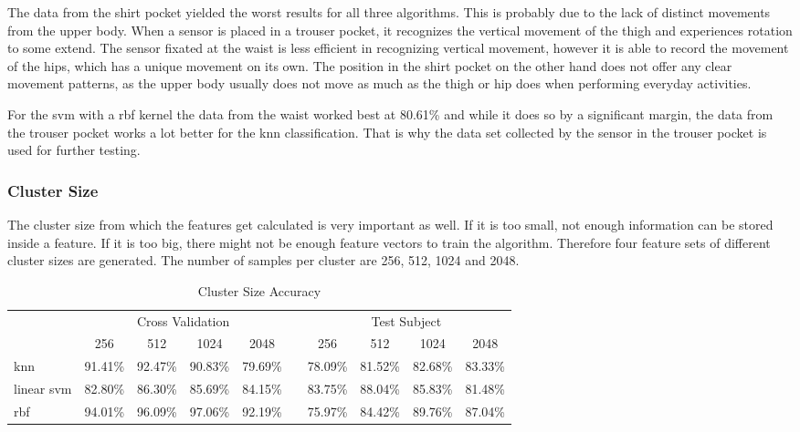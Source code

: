 The data from the shirt pocket yielded the worst results for all three algorithms. This is probably due to the lack of distinct movements from the upper body. When a sensor is placed in a trouser pocket, it recognizes the vertical movement of the thigh and experiences rotation to some extend.
The sensor fixated at the waist is less efficient in recognizing vertical movement, however it is able to record the movement of the hips, which has a unique movement on its own. The position in the shirt pocket on the other hand does not offer any clear movement patterns, as the upper body usually does not move as much as the thigh or hip does when performing everyday activities.

For the \gls{svm} with a \gls{rbf} kernel the data from the waist worked best at 80.61\% and while it does so by a significant margin, the data from the trouser pocket works a lot better for the \gls{knn} classification. That is why the data set collected by the sensor in the trouser pocket is used for further testing.


\subsubsection{Cluster Size}
The cluster size from which the features get calculated is very important as well. If it is too small, not enough information can be stored inside a feature. If it is too big, there might not be enough feature vectors to train the algorithm. Therefore four feature sets of different cluster sizes are generated. The number of samples per cluster are 256, 512, 1024 and 2048.

\begin{table}[!htb]
    \centering
    \begin{tabular}{@{}lccccccccc@{}}
        \toprule
         & \multicolumn{4}{c}{Cross Validation} & & \multicolumn{4}{c}{Test Subject} \\
        \cmidrule(lr){2-5} \cmidrule(l){7-10} 
         & 256 & 512 & 1024 & 2048 & & 256 & 512 & 1024 & 2048 \\
        \midrule
        \gls{knn}        & 91.41\% & 92.47\% & 90.83\% & 79.69\% &  & 78.09\% & 81.52\% & 82.68\% & 83.33\% \\
        linear \gls{svm} & 82.80\% & 86.30\% & 85.69\% & 84.15\% &  & 83.75\% & 88.04\% & 85.83\% & 81.48\% \\
        \gls{rbf}        & 94.01\% & 96.09\% & 97.06\% & 92.19\% &  & 75.97\% & 84.42\% & 89.76\% & 87.04\% \\
        \bottomrule
    \end{tabular}
    \caption{Cluster Size Accuracy}
    \label{table:cluster}
\end{table}

